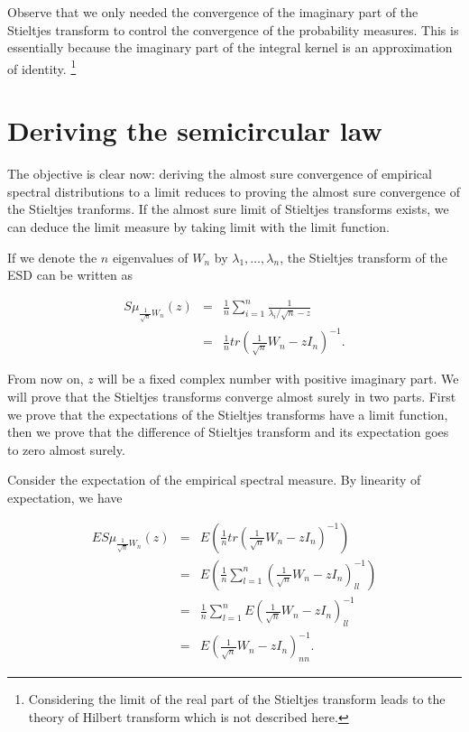 \documentclass[12pt,a4paper,leqno]{report}
\theoremstyle{plain}
\theoremstyle{definition}
\theoremstyle{remark}
\begin{document}
Observe that we only needed the convergence of the imaginary part of the Stieltjes transform to control the convergence of the probability measures. This is essentially because the imaginary part of the integral kernel is an approximation of identity. \footnote{Considering the limit of the real part of the Stieltjes transform leads to the theory of Hilbert transform which is not described here.}

\chapter{Deriving the semicircular law}
\label{semic}

The objective is clear now: deriving the almost sure convergence of empirical spectral distributions to a limit reduces to proving the almost sure convergence of the Stieltjes tranforms.
If the almost sure limit of Stieltjes transforms exists, we can deduce the limit measure by taking limit with the limit function.

If we denote the $n$ eigenvalues of $W_n$ by $\lambda_1, \ldots, \lambda_n$,  the Stieltjes transform of the ESD can be written as

\begin{eqnarray*}
S\mu_{\frac{1}{\sqrt{n}}W_n}(z) & = & 
\frac{1}{n} \sum_{i=1}^n \frac{1}{\lambda_i/\sqrt{n} - z}\\
& = & \frac{1}{n} tr(\frac{1}{\sqrt{n}}W_n - z I_n)^{-1}.
\end{eqnarray*}

From now on, $z$ will be a fixed complex number with positive imaginary part. We will prove that the Stieltjes transforms converge almost surely in two parts. First we prove that the expectations of the Stieltjes transforms have a limit function, then we prove that the difference of Stieltjes transform and its expectation goes to zero almost surely.

Consider the expectation of the empirical spectral measure. By linearity of expectation, we have

\begin{eqnarray*}
ES\mu_{\frac{1}{\sqrt{n}}W_n}(z) & = &
E(\frac{1}{n} tr(\frac{1}{\sqrt{n}}W_n - z I_n)^{-1})\\
& = & E(\frac{1}{n} \sum_{l=1}^n(\frac{1}{\sqrt{n}}W_n - z I_n)^{-1}_{ll})\\
& = & \frac{1}{n} \sum_{l=1}^n E(\frac{1}{\sqrt{n}}W_n - z I_n)^{-1}_{ll}\\
& = & E(\frac{1}{\sqrt{n}}W_n - z I_n)^{-1}_{nn}.
\end{eqnarray*}
\end{document}
